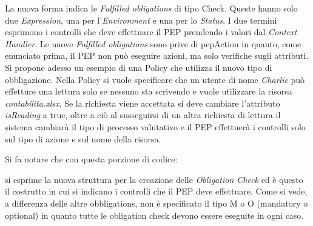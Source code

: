 La nuova forma indica le \emph{Fulfilled obligations} di tipo Check. Queste hanno solo due \emph{Expression}, una per
l'\emph{Environment} e una per lo \emph{Status}. I due termini esprimono i controlli che deve effettuare il \ac{PEP}
prendendo i valori dal \emph{Context Handler}. Le nuove \emph{Fulfilled obligations} sono prive di pepAction in quanto,
come enunciato prima, il \ac{PEP} non può eseguire azioni, ma solo verifiche sugli attributi.\\

Si propone adesso un esempio di una Policy che utilizza il nuovo tipo di obbligazione.
Nella Policy si vuole specificare che un utente di nome \emph{Charlie} può effetture una lettura solo se nessuno sta scrivendo
e vuole utilizzare la risorsa \emph{contabilita.xlsx}.
Se la richiesta viene accettata si deve cambiare l'attributo \emph{isReading} a true, oltre a ciò al susseguirsi
di un altra richiesta di lettura il sistema cambiarà il tipo di processo valutativo e il \ac{PEP} effettuerà i controlli
solo sul tipo di azione e sul nome della risorsa.\par

\newpage

\vspace{1em}
Si fa notare che con questa porzione di codice:

\vspace{1em}
si esprime la nuova struttura per la creazione delle \emph{Obligation Check} ed è questo il costrutto
in cui si indicano i controlli che il \ac{PEP} deve effettuare. Come si vede, a differenza delle altre
obbligations, non è specificato il tipo M o O (mandatory o optional) in quanto tutte le obligation check
devono essere eseguite in ogni caso.
\clearpage
